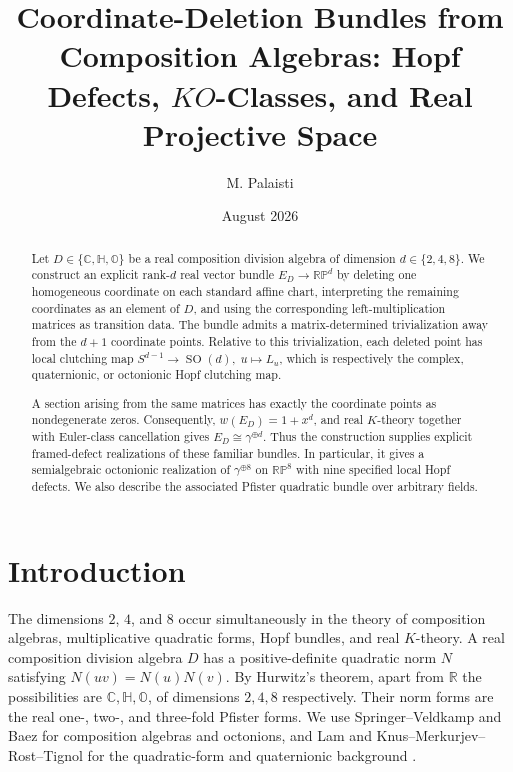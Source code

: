 \documentclass[12pt]{article}
\title{Coordinate-Deletion Bundles from Composition Algebras: Hopf Defects, $KO$-Classes, and Real Projective Space}
\author{M. Palaisti}
\date{August 2026}
\theoremstyle{plain}
\theoremstyle{definition}
\newcommand{\R}{\mathbb R}
\newcommand{\C}{\mathbb C}
\newcommand{\Hh}{\mathbb H}
\newcommand{\Oct}{\mathbb O}
\newcommand{\RP}{\mathbb{RP}}
\newcommand{\SO}{\operatorname{SO}}
\begin{document}
	\maketitle
	
\begin{abstract}
	Let \(D\in\{\C,\Hh,\Oct\}\) be a real composition division algebra of dimension \(d\in\{2,4,8\}\). We construct an explicit rank-\(d\) real vector bundle $	E_D\longrightarrow\RP^d$ by deleting one homogeneous coordinate on each standard affine chart, interpreting the remaining coordinates as an element of \(D\), and using the corresponding left-multiplication matrices as transition data. The bundle admits a matrix-determined trivialization away from the \(d+1\) coordinate points. Relative to this trivialization, each deleted point has local clutching map $
	S^{d-1}\longrightarrow\SO(d),\; u\longmapsto L_u$, which is respectively the complex, quaternionic, or octonionic Hopf
	clutching map.
	
	A section arising from the same matrices has exactly the coordinate points as nondegenerate zeros. Consequently, $w(E_D)=1+x^d$, and real \(K\)-theory together with Euler-class cancellation gives $E_D\cong\gamma^{\oplus d}$. Thus the construction supplies explicit framed-defect realizations of these familiar bundles. In particular, it gives a semialgebraic octonionic realization of \(\gamma^{\oplus8}\) on \(\RP^8\) with nine specified local Hopf defects. We also describe the associated Pfister quadratic bundle over arbitrary fields.
\end{abstract}
	
	\section{Introduction}

The dimensions $2$, $4$, and $8$ occur simultaneously in the theory of
composition algebras, multiplicative quadratic forms, Hopf bundles, and
real $K$-theory. A real composition division algebra $D$ has a
positive-definite quadratic norm $N$ satisfying $N(uv)=N(u)N(v)$. By Hurwitz's theorem, apart from $\R$ the possibilities are
$\C,\Hh,\Oct$, of dimensions $2,4,8$ respectively. Their norm forms are the real one-, two-, and three-fold Pfister forms. We use
Springer--Veldkamp and Baez for composition algebras and octonions, and
Lam and Knus--Merkurjev--Rost--Tignol for the quadratic-form and
quaternionic background \cite{SpringerVeldkamp,Baez,Lam,KMRT}.
\end{document}
